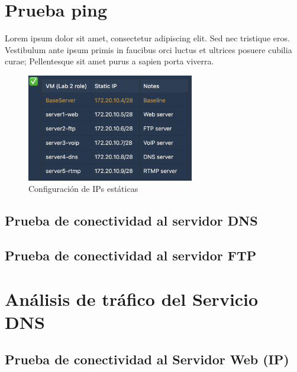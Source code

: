 \documentclass[10pt]{article}
\begin{document}
\renewcommand{\thesection}{8.\arabic{section}}
\setcounter{section}{0}
\section{Prueba ping}

Lorem ipsum dolor sit amet, consectetur adipiscing elit. Sed nec tristique eros. Vestibulum ante ipsum primis in faucibus orci luctus et ultrices posuere cubilia curae; Pellentesque sit amet purus a sapien porta viverra.


\begin{figure}[H]
    \centering
    \includegraphics[width=0.65\textwidth]{lab-02-screenshots/server-ips.png}
    \caption{Configuración de IPs estáticas}
\end{figure}


\subsection{Prueba de conectividad al servidor DNS}
\subsection{Prueba de conectividad al servidor FTP}


\renewcommand{\thesection}{8.\arabic{section}}
\section{Análisis de tráfico del Servicio DNS}
\subsection{Prueba de conectividad al Servidor Web (IP)}
\end{document}
